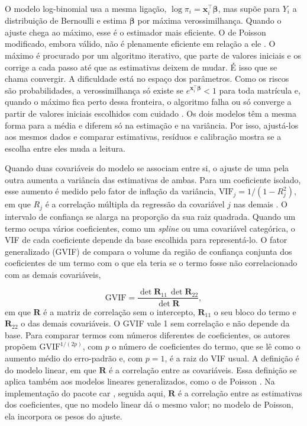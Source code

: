 \documentclass[12pt,a4paper]{article}
\begin{document}
O modelo log-binomial usa a mesma ligação, $\log \pi_i = \mathbf{x}_i^\top\boldsymbol{\beta}$, mas supõe para $Y_i$ a distribuição de Bernoulli e estima $\boldsymbol{\beta}$ por máxima verossimilhança. Quando o ajuste chega ao máximo, esse é o estimador mais eficiente. O de Poisson modificado, embora válido, não é plenamente eficiente em relação a ele \citep{spiegelman2005easy}. O máximo é procurado por um algoritmo iterativo, que parte de valores iniciais e os corrige a cada passo até que as estimativas deixem de mudar. É isso que se chama convergir. A dificuldade está no espaço dos parâmetros. Como os riscos são probabilidades, a verossimilhança só existe se $e^{\mathbf{x}_i^\top\boldsymbol{\beta}} < 1$ para toda matrícula e, quando o máximo fica perto dessa fronteira, o algoritmo falha ou só converge a partir de valores iniciais escolhidos com cuidado \citep{zou2004modified}. Os dois modelos têm a mesma forma para a média e diferem só na estimação e na variância. Por isso, ajustá-los aos mesmos dados e comparar estimativas, resíduos e calibração mostra se a escolha entre eles muda a leitura.

Quando duas covariáveis do modelo se associam entre si, o ajuste de uma pela outra aumenta a variância das estimativas de ambas. Para um coeficiente isolado, esse aumento é medido pelo fator de inflação da variância, $\text{VIF}_j = 1/(1 - R_j^2)$, em que $R_j$ é a correlação múltipla da regressão da covariável $j$ nas demais \citep[p.~432]{fox2019companion}. O intervalo de confiança se alarga na proporção da sua raiz quadrada. Quando um termo ocupa vários coeficientes, como um \textit{spline} ou uma covariável categórica, o VIF de cada coeficiente depende da base escolhida para representá-lo. O fator generalizado (GVIF) de \citet{fox1992generalized} compara o volume da região de confiança conjunta dos coeficientes de um termo com o que ela teria se o termo fosse não correlacionado com as demais covariáveis,

\begin{equation}
  \text{GVIF} = \frac{\det \mathbf{R}_{11}\, \det \mathbf{R}_{22}}{\det \mathbf{R}},
\end{equation}
em que $\mathbf{R}$ é a matriz de correlação sem o intercepto, $\mathbf{R}_{11}$ o seu bloco do termo e $\mathbf{R}_{22}$ o das demais covariáveis. O GVIF vale 1 sem correlação e não depende da base. Para comparar termos com números diferentes de coeficientes, os autores propõem $\text{GVIF}^{1/(2p)}$, com $p$ o número de coeficientes do termo, que se lê como o aumento médio do erro-padrão e, com $p = 1$, é a raiz do VIF usual. A definição é do modelo linear, em que $\mathbf{R}$ é a correlação entre as covariáveis. Essa definição se aplica também aos modelos lineares generalizados, como o de Poisson \citep[pp.~432--434]{fox2019companion}. Na implementação do pacote car \citep{fox2026car}, seguida aqui, $\mathbf{R}$ é a correlação entre as estimativas dos coeficientes, que no modelo linear dá o mesmo valor; no modelo de Poisson, ela incorpora os pesos do ajuste.
\end{document}
